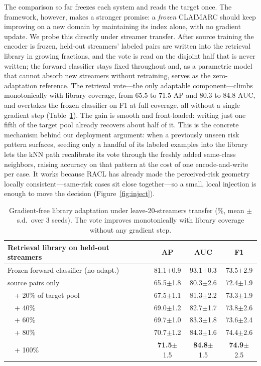 \documentclass[letterpaper]{article}
\newcommand{\best}[1]{\textbf{#1}}
\newcommand{\std}[1]{{\scriptsize$\pm$#1}}
\begin{document}
The comparison so far freezes each system and reads the target once. The framework, however, makes a stronger promise: a \emph{frozen} CLAIMARC should keep improving on a new domain by maintaining its index alone, with no gradient update. We probe this directly under streamer transfer. After source training the encoder is frozen, held-out streamers' labeled pairs are written into the retrieval library in growing fractions, and the vote is read on the disjoint half that is never written; the forward classifier stays fixed throughout and, as a parametric model that cannot absorb new streamers without retraining, serves as the zero-adaptation reference. The retrieval vote---the only adaptable component---climbs monotonically with library coverage, from 65.5 to 71.5 AP and 80.3 to 84.8 AUC, and overtakes the frozen classifier on F1 at full coverage, all without a single gradient step (Table~\ref{tab:inject}). The gain is smooth and front-loaded: writing just one fifth of the target pool already recovers about half of it. This is the concrete mechanism behind our deployment argument: when a previously unseen risk pattern surfaces, seeding only a handful of its labeled examples into the library lets the kNN path recalibrate its vote through the freshly added same-class neighbors, raising accuracy on that pattern at the cost of one encode-and-write per case. It works because RACL has already made the perceived-risk geometry locally consistent---same-risk cases sit close together---so a small, local injection is enough to move the decision (Figure~\ref{fig:inject}).

\begin{table}[t]
\centering\small
\setlength{\tabcolsep}{6pt}
\begin{tabular}{lccc}
\toprule
Retrieval library on held-out streamers & AP & AUC & F1 \\
\midrule
Frozen forward classifier (no adapt.) & 81.1\std{0.9} & 93.1\std{0.3} & 73.5\std{2.9} \\
\midrule
source pairs only & 65.5\std{1.8} & 80.3\std{2.6} & 72.4\std{1.9} \\
\ \ + 20\% of target pool & 67.5\std{1.1} & 81.3\std{2.2} & 73.3\std{1.9} \\
\ \ + 40\% & 69.0\std{1.2} & 82.7\std{1.7} & 73.8\std{2.6} \\
\ \ + 60\% & 69.7\std{1.0} & 83.3\std{1.8} & 73.6\std{2.4} \\
\ \ + 80\% & 70.7\std{1.2} & 84.3\std{1.6} & 74.4\std{2.6} \\
\ \ + 100\% & \best{71.5}\std{1.5} & \best{84.8}\std{1.5} & \best{74.9}\std{2.5} \\
\bottomrule
\end{tabular}
\caption{Gradient-free library adaptation under leave-20-streamers transfer (\%, mean $\pm$ s.d.\ over 3 seeds). The vote improves monotonically with library coverage without any gradient step.}
\label{tab:inject}
\end{table}
\end{document}
